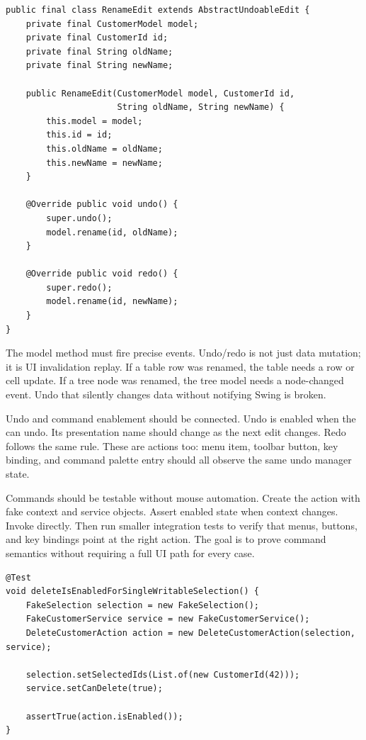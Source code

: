 \begin{lstlisting}[caption={An undoable command expressed as an edit.}]
public final class RenameEdit extends AbstractUndoableEdit {
    private final CustomerModel model;
    private final CustomerId id;
    private final String oldName;
    private final String newName;

    public RenameEdit(CustomerModel model, CustomerId id,
                      String oldName, String newName) {
        this.model = model;
        this.id = id;
        this.oldName = oldName;
        this.newName = newName;
    }

    @Override public void undo() {
        super.undo();
        model.rename(id, oldName);
    }

    @Override public void redo() {
        super.redo();
        model.rename(id, newName);
    }
}
\end{lstlisting}

The model method must fire precise events. Undo/redo is not just data mutation; it is UI invalidation replay. If a table row was renamed, the table needs a row or cell update. If a tree node was renamed, the tree model needs a node-changed event. Undo that silently changes data without notifying Swing is broken.

Undo and command enablement should be connected. Undo is enabled when the  can undo. Its presentation name should change as the next edit changes. Redo follows the same rule. These are actions too: menu item, toolbar button, key binding, and command palette entry should all observe the same undo manager state.

Commands should be testable without mouse automation. Create the action with fake context and service objects. Assert enabled state when context changes. Invoke  directly. Then run smaller integration tests to verify that menus, buttons, and key bindings point at the right action. The goal is to prove command semantics without requiring a full UI path for every case.

\begin{lstlisting}[caption={Testing enablement without a visible UI.}]
@Test
void deleteIsEnabledForSingleWritableSelection() {
    FakeSelection selection = new FakeSelection();
    FakeCustomerService service = new FakeCustomerService();
    DeleteCustomerAction action = new DeleteCustomerAction(selection, service);

    selection.setSelectedIds(List.of(new CustomerId(42)));
    service.setCanDelete(true);

    assertTrue(action.isEnabled());
}
\end{lstlisting}

